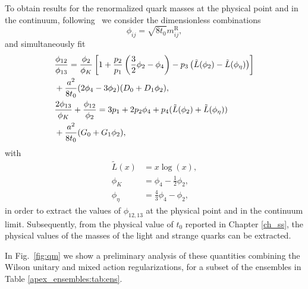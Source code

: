 To obtain results for the renormalized quark masses at the physical point and in the continuum, following~\citep{qm} we consider the dimensionless combinations
\begin{equation}
\label{eq:phiij}
\phi_{ij}=\sqrt{8t_0}m_{ij}^{\textrm{R}},
\end{equation}
and simultaneously fit
\begin{align}
&\frac{\phi_{12}}{\phi_{13}}=\frac{\phi_2}{\phi_K}\left[1+\frac{p_2}{p_1}\left(\frac{3}{2}\phi_2-\phi_4\right)-p_3\left(\tilde{L}(\phi_2)-\tilde{L}(\phi_{\eta})\right)\right] \notag \\
&+\frac{a^2}{8t_0}(2\phi_4-3\phi_2)(D_0+D_1\phi_2),\\
&\frac{2\phi_{13}}{\phi_K}+\frac{\phi_{12}}{\phi_2}=3p_1+2p_2\phi_4+p_4(\tilde{L}(\phi_2)+\tilde{L}(\phi_{\eta})) \notag \\
&+\frac{a^2}{8t_0}(G_0+G_1\phi_2),
\end{align}
with
\begin{align}
\tilde{L}(x)&=x\log(x),\\
\phi_K&=\phi_4-\frac{1}{2}\phi_2,\\
\phi_{\eta}&=\frac{4}{3}\phi_4-\phi_2,
\end{align}
in order to extract the values of $\phi_{12,13}$ at the physical point and in the continuum limit. Subsequently, from the physical value of $t_0$ reported in Chapter \ref{ch_ss}, the physical values of the masses of the light and strange quarks can be extracted.

In Fig.~\ref{fig:qm} we show a preliminary analysis of these quantities combining the Wilson unitary and mixed action regularizations, for a subset of the ensembles in Table \ref{apex_ensembles:tab:ens}.

